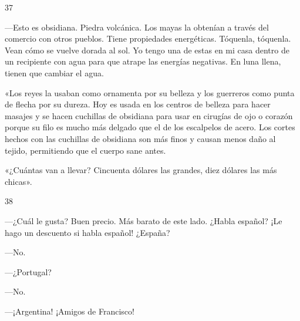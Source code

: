 \documentclass[12pt,twoside,openright,a5paper]{book}
\begin{document}
\vspace{0.5cm}

\hrulefill \hspace{0.1cm}\decofourleft\hspace{0.2cm} 37 \hspace{0.2cm}\decofourright \hspace{0.1cm}\hrulefill

\nopagebreak

\vspace{0.5cm}

\nopagebreak

---Esto es obsidiana. Piedra volcánica. Los mayas la obtenían a través
del comercio con otros pueblos. Tiene propiedades energéticas. Tóquenla,
tóquenla. Vean cómo se vuelve dorada al sol. Yo tengo una de estas en
mi casa dentro de un recipiente con agua para que atrape las energías
negativas. En luna llena, tienen que cambiar el agua.

«Los reyes la usaban como ornamenta por su belleza y los guerreros como punta
de flecha por su dureza. Hoy es usada en los centros de belleza para hacer
masajes y se hacen cuchillas de obsidiana para usar en cirugías de ojo o
corazón porque su filo es mucho más delgado que el de los escalpelos de
acero. Los cortes hechos con las cuchillas de obsidiana son más finos y
causan menos daño al tejido, permitiendo que el cuerpo sane antes.

«¿Cuántas van a llevar? Cincuenta dólares las grandes, diez dólares las más chicas».

\vspace{0.5cm}

\hrulefill \hspace{0.1cm}\decofourleft\hspace{0.2cm} 38 \hspace{0.2cm}\decofourright \hspace{0.1cm}\hrulefill

\nopagebreak

\vspace{0.5cm}

\nopagebreak

---¿Cuál le gusta? Buen precio. Más barato de este lado. ¿Habla español? ¡Le
hago un descuento si habla español! ¿España?

---No.

---¿Portugal?

---No.

---¡Argentina! ¡Amigos de Francisco!
\end{document}

